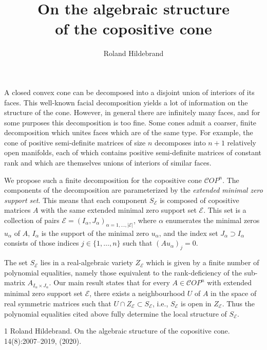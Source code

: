 \documentclass[a4paper]{amsart}
\date{}
\begin{document}
\title{On the algebraic structure \\ of the copositive cone}
\author{Roland Hildebrand} %
\address{Univ. Grenoble Alpes, CNRS, Grenoble INP, LJK, 38000 Grenoble, France} %

\maketitle


A closed convex cone can be decomposed into a disjoint union of interiors of its faces. This well-known facial decomposition yields a lot of information on the structure of the cone. However, in general there are infinitely many faces, and for some purposes this decomposition is too fine. Some cones admit a coarser, finite decomposition which unites faces which are of the same type. For example, the cone of positive semi-definite matrices of size $n$ decomposes into $n+1$ relatively open manifolds, each of which contains positive semi-definite matrices of constant rank and which are themselves unions of interiors of similar faces.

We propose such a finite decomposition for the copositive cone ${\mathcal COP}^n$. The components of the decomposition are parameterized by the \emph{extended minimal zero support set}. This means that each component $S_{\mathcal E}$ is composed of copositive matrices $A$ with the same extended minimal zero support set ${\mathcal E}$. This set is a collection of pairs ${\mathcal E} = (I_{\alpha},J_{\alpha})_{\alpha = 1,\dots,|{\mathcal E}|}$, where $\alpha$ enumerates the minimal zeros $u_{\alpha}$ of $A$, $I_{\alpha}$ is the support of the minimal zero $u_{\alpha}$, and the index set $J_{\alpha} \supset I_{\alpha}$ consists of those indices $j \in \{1,\dots,n\}$ such that $(Au_{\alpha})_j = 0$.

The set $S_{\mathcal E}$ lies in a real-algebraic variety $Z_{\mathcal E}$ which is given by a finite number of polynomial equalities, namely those equivalent to the rank-deficiency of the sub-matrix $A_{I_{\alpha} \times J_{\alpha}}$. Our main result states that for every $A \in {\mathcal COP}^n$ with extended minimal zero support set ${\mathcal E}$, there exists a neighbourhood $U$ of $A$ in the space of real symmetric matrices such that $U \cap Z_{\mathcal E} \subset S_{\mathcal E}$, i.e., $S_{\mathcal E}$ is open in $Z_{\mathcal E}$. Thus the polynomial equalities cited above fully determine the local structure of $S_{\mathcal E}$.

\begin{thebibliography}{1}
Roland Hildebrand.
\newblock On the algebraic structure of the copositive cone.
  14(8):2007–2019,  (2020).
\end{thebibliography}
\end{document}
